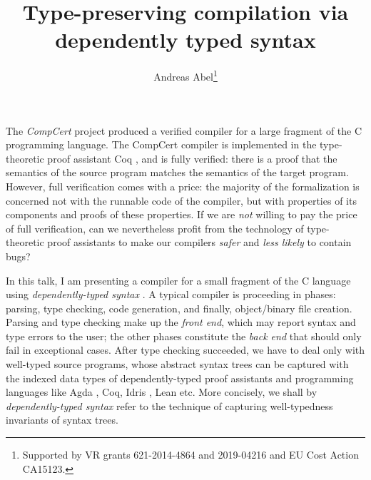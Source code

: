 \documentclass[a4paper]{easychair}
\begin{document}
\title{Type-preserving compilation via dependently typed syntax}%
\author{Andreas Abel\thanks{Supported by VR grants 621-2014-4864 and
    2019-04216 and EU
  Cost Action CA15123.}}


\maketitle


\noindent

The \emph{CompCert} project \citep{leroy:cacm09} produced a verified
compiler for a large fragment of the C programming language.  The
CompCert compiler is implemented in the type-theoretic proof assistant
Coq \citep{inria:coq89}, and is fully verified: there is a proof that
the semantics of the source program matches the semantics of the
target program.  However, full verification comes with a price: the
majority of the formalization is concerned not with the runnable code
of the compiler, but with properties of its components and proofs of
these properties.
If we are \emph{not} willing to pay the price of full verification, can we
nevertheless profit from the technology of type-theoretic proof
assistants to make our compilers \emph{safer} and \emph{less likely}
to contain bugs?

In this talk, I am presenting a compiler for a small fragment of the C
language using \emph{dependently-typed syntax}
\citep{bentonHurKennedyMcBride:jar12,allaisAtkeyChapmanMcBrideMcKinna:icfp18}.
A typical compiler is proceeding in phases: parsing, type checking,
code generation, and finally, object/binary file creation.  Parsing and type
checking make up the \emph{front end}, which may report syntax and
type errors to the user; the other phases constitute the \emph{back
  end} that should only fail in exceptional cases.  After type
checking succeeded, we have to deal only with well-typed source
programs, whose abstract syntax trees can be captured with the indexed
data types of dependently-typed proof assistants and programming
languages like Agda \citep{agda:260}, Coq, Idris \citep{brady:jfp13},
Lean \citep{deMoura:cade15} etc.  More concisely, we shall by
\emph{dependently-typed syntax} refer to the technique of capturing
well-typedness invariants of syntax trees.
\end{document}
